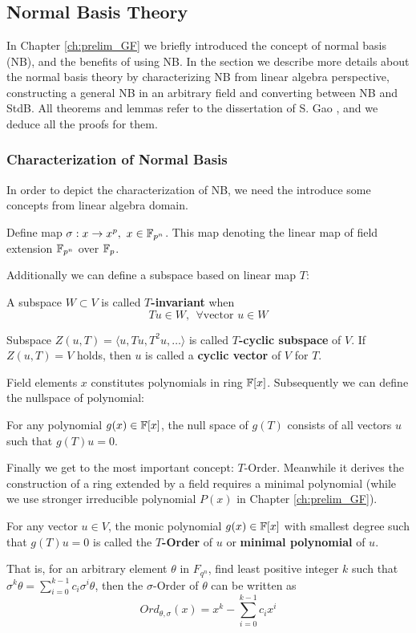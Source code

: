 \appendix
\chapter{}
\fixchapterheading
\section{Normal Basis Theory}
\label{append:NB}
In Chapter \ref{ch:prelim_GF} we briefly introduced the concept of normal basis (NB), and 
the benefits of using NB. In the section we describe more details about the normal basis theory by 
characterizing NB from linear algebra perspective, constructing a general NB in an 
arbitrary field and converting between NB and StdB. All theorems and lemmas refer to the 
dissertation of S. Gao \cite{gao:phd_normal_basis}, and we deduce all the proofs for them.
\subsection{Characterization of Normal Basis}
In order to depict the characterization of NB, we need the introduce some concepts from linear algebra domain.
\begin{Definition}
Define map $\sigma:x\to x^p,~x\in {\mathbb{F}}_{p^n}$. This map denoting the linear map of field extension ${\mathbb{F}}_{p^n}$
over ${\mathbb{F}}_p$.
\end{Definition}
Additionally we can define a subspace based on linear map $T$:
\begin{Definition}
A subspace $W\subset V$ is called {\bf $T$-invariant} when 
$$Tu \in W, ~~ \forall \text{vector }u\in W$$

Subspace $Z(u,T) = \langle u,Tu,T^2u,\dots\rangle$ is called {\bf $T$-cyclic subspace} of $V$.
If $Z(u,T) = V$ holds, then $u$ is called a {\bf cyclic vector} of $V$ for $T$.
\end{Definition}
Field elements $x$ constitutes polynomials in ring ${\mathbb{F}}[x]$. Subsequently we can define the 
nullspace of polynomial:
\begin{Definition}
\label{def:nullspace}
For any polynomial $g(x) \in {\mathbb{F}}[x]$, the null space of $g(T)$ consists of all vectors $u$ such that
$g(T)u = 0$.
\end{Definition}
Finally we get to the most important concept: $T$-Order. Meanwhile it derives the construction of a ring extended by a field requires
a minimal polynomial (while we use stronger irreducible polynomial $P(x)$ in Chapter \ref{ch:prelim_GF}).
\begin{Definition}
For any vector $u \in V$, the monic polynomial $g(x) \in {\mathbb{F}}[x]$ with smallest degree such that
$g(T)u = 0$ is called the {\bf $T$-Order} of $u$ or {\bf minimal polynomial} of $u$.

That is, for an arbitrary element $\theta$ in $F_{q^n}$, find least positive integer $k$ such that
$\sigma^k\theta = \sum_{i=0}^{k-1} c_i\sigma^i\theta$, then the $\sigma$-Order of $\theta$ can be 
written as $$Ord_{\theta,\sigma}(x) = x^k - \sum_{i=0}^{k-1} c_ix^i$$
\end{Definition}

